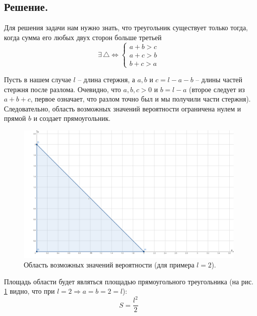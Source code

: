 \documentclass[a4paper, 12pt]{article}
\begin{document}
    \subsection{Решение.}
    Для решения задачи нам нужно знать, что треугольник существует только тогда,
    когда сумма его любых двух сторон больше третьей
    $$
    \exists\,\bigtriangleup \Leftrightarrow
    \begin{cases}
        a+b>c\\
        a+c>b\\
        b+c>a
    \end{cases}
    $$


    Пусть в нашем случае $l$ -- длина стержня, а $a,b \text{ и } c=l-a-b$ -- длины частей стержня после разлома.
    Очевидно, что $a,b,c>0$ и $b=l-a$ (второе следует из $a+b+c$, первое означает, что разлом точно был и мы получили
    части стержня). Следовательно, область возможных значений вероятности ограничена нулем и прямой $b$ и создает прямоугольник.
    \begin{figure}[H]
        \centering
        \includegraphics[scale=3]{show.png}
        \captionsetup{skip=0pt}
        \caption{Область возможных значений вероятности (для примера $l=2$).}
        \label{fig:show}
    \end{figure}


    Площадь области будет являться площадью прямоугольного треугольника (на рис. \ref{fig:show} видно, что при $l=2\Rightarrow a=b=2=l$):
    $$
    S=\dfrac{l^2}{2}
    $$
\end{document}
